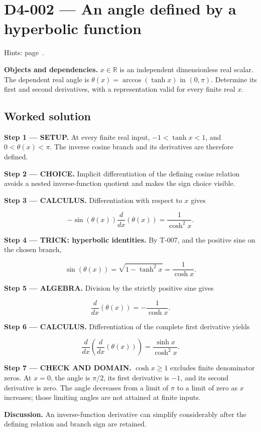 \documentclass[11pt,oneside,openany]{book}
\begin{document}
\section{D4-002 --- An angle defined by a hyperbolic function}
\label{problem:D4-002}
{\small Hints: page~\pageref{hints:D4-002}.}\par\medskip

\textbf{Objects and dependencies.} \(x\in\mathbb R\) is an independent dimensionless real scalar. The dependent real angle is \(\theta(x)=\arccos(\tanh x)\) in \((0,\pi)\). Determine its first and second derivatives, with a representation valid for every finite real \(x\).
\subsection*{Worked solution}

\textbf{Step 1 --- SETUP.} At every finite real input, \(-1<\tanh x<1\), and \(0<\theta(x)<\pi\). The inverse cosine branch and its derivatives are therefore defined.

\begin{ChoiceStep}
\textbf{Step 2 --- CHOICE.} Implicit differentiation of the defining cosine relation avoids a nested inverse-function quotient and makes the sign choice visible.

\end{ChoiceStep}
\textbf{Step 3 --- CALCULUS.} Differentiation with respect to \(x\) gives

\[
-\sin(\theta(x))\frac{d}{dx}\left(\theta(x)\right)=\frac{1}{\cosh^2x}.
\]

\begingroup\color{TrickPurple}
\textbf{Step 4 --- TRICK: hyperbolic identities.} By T-007, and the positive sine on the chosen branch,

\[
\sin(\theta(x))=\sqrt{1-\tanh^2x}=\frac{1}{\cosh x}.
\]

\endgroup
\begingroup\color{AlgebraBlue}
\textbf{Step 5 --- ALGEBRA.} Division by the strictly positive sine gives

\[
\frac{d}{dx}\left(\theta(x)\right)=-\frac{1}{\cosh x}.
\]

\endgroup
\textbf{Step 6 --- CALCULUS.} Differentiation of the complete first derivative yields

\[
\frac{d}{dx}\left(\frac{d}{dx}\left(\theta(x)\right)\right)
=\frac{\sinh x}{\cosh^2x}.
\]

\begin{DomainStep}
\textbf{Step 7 --- CHECK AND DOMAIN.} \(\cosh x\ge1\) excludes finite denominator zeros. At \(x=0\), the angle is \(\pi/2\), its first derivative is \(-1\), and its second derivative is zero. The angle decreases from a limit of \(\pi\) to a limit of zero as \(x\) increases; those limiting angles are not attained at finite inputs.

\end{DomainStep}
\textbf{Discussion.} An inverse-function derivative can simplify considerably after the defining relation and branch sign are retained.
\clearpage
\end{document}
